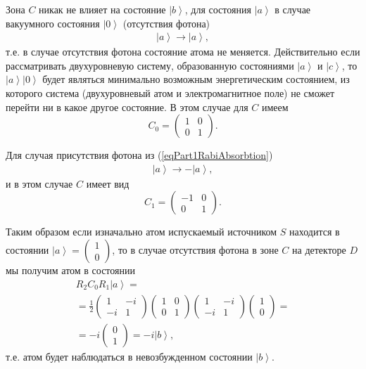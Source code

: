 Зона $C$ никак не влияет на состояние $\left|b\right>$, для состояния
$\left|a\right>$ в случае вакуумного состояния $\left|0\right>$
(отсутствия фотона)
\begin{eqnarray}
  \left|a\right> \rightarrow \left|a\right>,
  \nonumber
\end{eqnarray}
т.е. в случае отсутствия фотона состояние атома не
меняется. Действительно если рассматривать двухуровневую систему,
образованную состояниями $\left|a\right>$ и $\left|c\right>$, то
$\left|a\right>\left|0\right>$ будет являться минимально возможным
энергетическим состоянием, из которого система (двухуровневый атом и
электромагнитное поле) не сможет перейти ни в
какое другое состояние.
В этом случае для $C$ имеем
\[
C_0 = \left(
\begin{array} {cc}
1 & 0
\\
0 & 1 
\end{array}
\right).
\]

Для случая присутствия фотона из (\ref{eqPart1RabiAbsorbtion})
\begin{eqnarray}
  \left|a\right> \rightarrow -\left|a\right>,
  \nonumber
\end{eqnarray}
и в этом случае $C$ имеет вид
\[
C_1 = \left(
\begin{array} {cc}
-1 & 0
\\
0 & 1 
\end{array}
\right).
\]

Таким образом если изначально атом испускаемый источником $S$
находится в состоянии $\left|a\right> = \left(
\begin{array} {c}
1
\\
0
\end{array}
\right)$, то в случае отсутствия фотона в зоне $C$ на детекторе $D$ мы
получим атом в состоянии
\begin{eqnarray}
  R_2 C_0 R_1 \left|a\right> =
  \nonumber \\
  =
  \frac{1}{2}
  \left(
  \begin{array} {cc}
    1 & -i
    \\
    -i & 1 
  \end{array}
  \right)
  \left(
  \begin{array} {cc}
    1 & 0
    \\
    0 & 1 
  \end{array}
  \right)
  \left(
  \begin{array} {cc}
    1 & -i
    \\
    -i & 1 
  \end{array}
  \right)
  \left(
  \begin{array} {c}
    1
    \\
    0
  \end{array}
  \right) =
  \nonumber \\
  =
  -i 
  \left(
  \begin{array} {c}
    0
    \\
    1
  \end{array}
  \right) =
  -i \left|b\right>,
  \nonumber
\end{eqnarray}
т.е. атом будет наблюдаться в невозбужденном состоянии
$\left|b\right>$.

